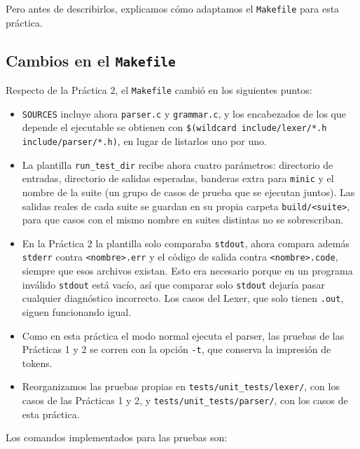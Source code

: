 \documentclass[12pt,letterpaper]{article}
\begin{document}
Pero antes de describirlos, explicamos cómo adaptamos el \texttt{Makefile} para esta práctica.

\subsection*{Cambios en el \texttt{Makefile}}

Respecto de la Práctica 2, el \texttt{Makefile} cambió en los siguientes puntos:

\begin{itemize}
\item \texttt{SOURCES} incluye ahora \texttt{parser.c} y \texttt{grammar.c}, y los encabezados de los que
  depende el ejecutable se obtienen con \texttt{\$(wildcard include/lexer/*.h include/parser/*.h)}, en lugar
  de listarlos uno por uno.
  
\item La plantilla \texttt{run\_test\_dir} recibe ahora cuatro parámetros: directorio de entradas, directorio
  de salidas esperadas, banderas extra para \texttt{minic} y el nombre de la suite
  (un grupo de casos de prueba que se ejecutan juntos).
  Las salidas reales de cada suite se guardan en su propia carpeta \texttt{build/<suite>}, para que casos con
  el mismo nombre en suites distintas no se sobrescriban.
  
\item En la Práctica 2 la plantilla solo comparaba \texttt{stdout}, ahora compara además \texttt{stderr}
  contra \texttt{<nombre>.err} y el código de salida contra \texttt{<nombre>.code}, siempre que esos archivos
  existan. Esto era necesario porque en un programa inválido \texttt{stdout} está vacío, así que comparar solo
  \texttt{stdout} dejaría pasar cualquier diagnóstico incorrecto. Los casos del Lexer, que solo tienen
  \texttt{.out}, siguen funcionando igual.
  
\item Como en esta práctica el modo normal ejecuta el parser, las pruebas de las Prácticas 1 y 2 se corren
  con la opción \texttt{-t}, que conserva la impresión de tokens.
  
\item Reorganizamos las pruebas propias en \texttt{tests/unit\_tests/lexer/}, con los casos de las Prácticas
  1 y 2, y \texttt{tests/unit\_tests/parser/}, con los casos de esta práctica.
\end{itemize}

Los comandos implementados para las pruebas son:
\end{document}
